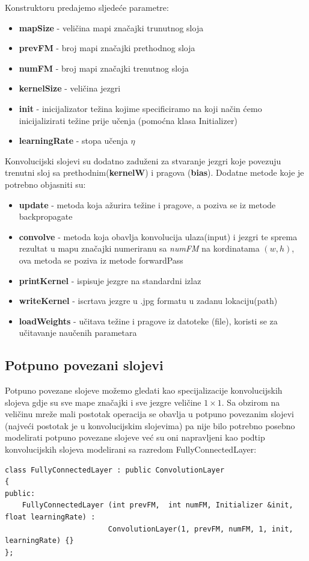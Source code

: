 \documentclass[times, utf8, zavrsni]{fer}
\begin{document}
Konstruktoru predajemo sljedeće parametre:
\begin{itemize}
\item \textbf{mapSize} - veličina mapi značajki trunutnog sloja
\item \textbf{prevFM} - broj mapi značajki prethodnog sloja
\item \textbf{numFM} - broj mapi značajki trenutnog sloja
\item \textbf{kernelSize} - veličina jezgri
\item \textbf{init} - inicijalizator težina kojime specificiramo na koji način ćemo inicijalizirati težine prije učenja (pomoćna klasa Initializer)
\item \textbf{learningRate} - stopa učenja $\eta$
\end{itemize}

Konvolucijski slojevi su dodatno zaduženi za stvaranje jezgri koje povezuju trenutni sloj sa prethodnim(\textbf{kernelW}) i pragova (\textbf{bias}). Dodatne metode koje je potrebno objasniti su:
\begin{itemize}
\item \textbf{update} - metoda koja ažurira težine i pragove, a poziva se iz metode backpropagate
\item \textbf{convolve} - metoda koja obavlja konvolucija ulaza(input) i jezgri te sprema rezultat u mapu značajki numeriranu sa \textit{numFM} na kordinatama $(w, h)$, ova metoda se poziva iz metode forwardPass
\item \textbf{printKernel} - ispisuje jezgre na standardni izlaz
\item \textbf{writeKernel} - iscrtava jezgre u .jpg formatu u zadanu lokaciju(path)
\item \textbf{loadWeights} - učitava težine i pragove iz datoteke (file), koristi se za učitavanje naučenih parametara
\end{itemize}

\subsection{Potpuno povezani slojevi}
Potpuno povezane slojeve možemo gledati kao specijalizacije konvolucijskih slojeva gdje su sve mape značajki i sve jezgre veličine $1 \times 1$. Sa obzirom na veličinu mreže mali postotak operacija se obavlja u potpuno povezanim slojevi (najveći postotak je u konvolucijskim slojevima) pa nije bilo potrebno posebno modelirati potpuno povezane slojeve već su oni napravljeni kao podtip konvolucijskih slojeva modelirani sa razredom FullyConnectedLayer:
\begin{lstlisting}[caption=Razred FullyConnectedLayer,
  label=FullLayer]
class FullyConnectedLayer : public ConvolutionLayer
{
public:
    FullyConnectedLayer (int prevFM,  int numFM, Initializer &init, float learningRate) :
                        ConvolutionLayer(1, prevFM, numFM, 1, init, learningRate) {}
};
\end{lstlisting}
\end{document}
